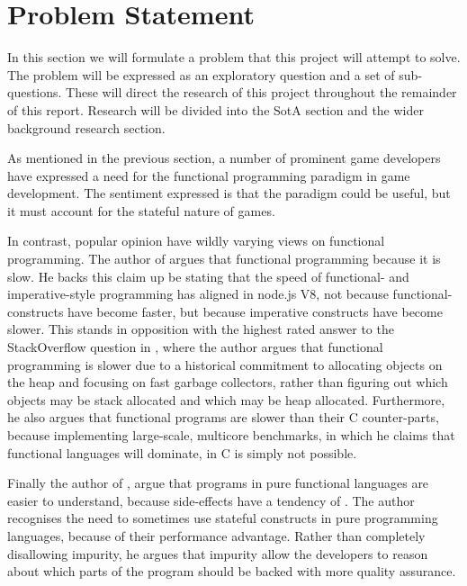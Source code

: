 \section{Problem Statement}
In this section we will formulate a problem that this project will attempt to solve. The problem will be expressed as an exploratory question and a set of sub-questions. These will direct the research of this project throughout the remainder of this report. Research will be divided into the \ac{SotA} section and the wider background research section.

As mentioned in the previous section, a number of prominent game developers have expressed a need for the functional programming paradigm in game development. The sentiment expressed is that the paradigm could be useful, but it must account for the stateful nature of games.



In contrast, popular opinion have wildly varying views on functional programming. The author of \cite{pop:functional:sucks} argues that functional programming  because it is slow. He backs this claim up be stating that the speed of functional- and imperative-style programming has aligned in node.js V8, not because functional-constructs have become faster, but because imperative constructs have become slower. This stands in opposition with the highest rated answer to the StackOverflow question in \cite{pop:functional:slow}, where the author argues that functional programming is slower due to a historical commitment to allocating objects on the heap and focusing on fast garbage collectors, rather than figuring out which objects may be stack allocated and which may be heap allocated. Furthermore, he also argues that functional programs are slower than their C counter-parts, because implementing large-scale, multicore benchmarks, in which he claims that functional languages will dominate, in C is simply not possible.

Finally the author of \cite{pop:functional:definition}, argue that programs in pure functional languages are easier to understand, because side-effects have a tendency of \textit{}. The author recognises the need to sometimes use stateful constructs in pure programming languages, because of their performance advantage. Rather than completely disallowing impurity, he argues that impurity allow the developers to reason about which parts of the program should be backed with more quality assurance.

